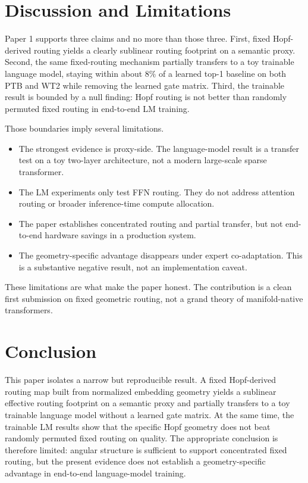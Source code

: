 \documentclass[10pt,twocolumn]{article}
\begin{document}
\section{Discussion and Limitations}
Paper 1 supports three claims and no more than those three. First, fixed Hopf-derived routing yields a clearly sublinear routing footprint on a semantic proxy. Second, the same fixed-routing mechanism partially transfers to a toy trainable language model, staying within about $8\%$ of a learned top-1 baseline on both PTB and WT2 while removing the learned gate matrix. Third, the trainable result is bounded by a null finding: Hopf routing is not better than randomly permuted fixed routing in end-to-end LM training.

Those boundaries imply several limitations.
\begin{itemize}
\item The strongest evidence is proxy-side. The language-model result is a transfer test on a toy two-layer architecture, not a modern large-scale sparse transformer.
\item The LM experiments only test FFN routing. They do not address attention routing or broader inference-time compute allocation.
\item The paper establishes concentrated routing and partial transfer, but not end-to-end hardware savings in a production system.
\item The geometry-specific advantage disappears under expert co-adaptation. This is a substantive negative result, not an implementation caveat.
\end{itemize}

These limitations are what make the paper honest. The contribution is a clean first submission on fixed geometric routing, not a grand theory of manifold-native transformers.

\section{Conclusion}
This paper isolates a narrow but reproducible result. A fixed Hopf-derived routing map built from normalized embedding geometry yields a sublinear effective routing footprint on a semantic proxy and partially transfers to a toy trainable language model without a learned gate matrix. At the same time, the trainable LM results show that the specific Hopf geometry does not beat randomly permuted fixed routing on quality. The appropriate conclusion is therefore limited: angular structure is sufficient to support concentrated fixed routing, but the present evidence does not establish a geometry-specific advantage in end-to-end language-model training.
\end{document}

